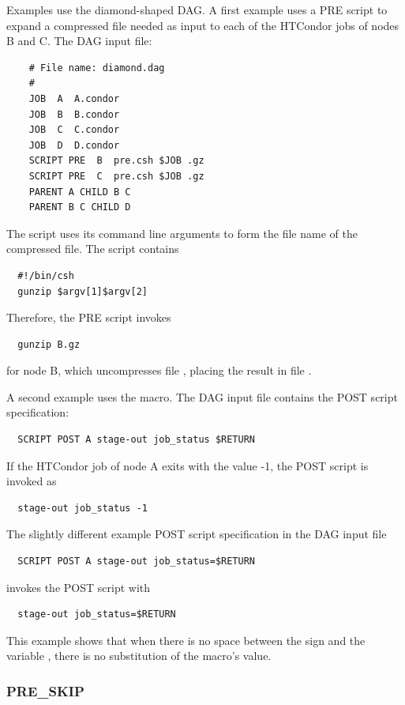 
Examples use the diamond-shaped DAG.
A first example uses a PRE script to expand a compressed file 
needed as input to each of the HTCondor jobs of nodes B and C.
The DAG input file:

\footnotesize
\begin{verbatim}
    # File name: diamond.dag
    #
    JOB  A  A.condor 
    JOB  B  B.condor 
    JOB  C  C.condor	
    JOB  D  D.condor
    SCRIPT PRE  B  pre.csh $JOB .gz
    SCRIPT PRE  C  pre.csh $JOB .gz
    PARENT A CHILD B C
    PARENT B C CHILD D
\end{verbatim}
\normalsize

The script  uses its command line arguments to form the file name
of the compressed file.
The script contains

\begin{verbatim}
  #!/bin/csh
  gunzip $argv[1]$argv[2]
\end{verbatim}

Therefore, the PRE script invokes  
\begin{verbatim}
  gunzip B.gz
\end{verbatim}
for node B, which uncompresses file ,
placing the result in file .

A second example uses the  macro.
The DAG input file contains the POST script specification:
\begin{verbatim}
  SCRIPT POST A stage-out job_status $RETURN 
\end{verbatim}
If the HTCondor job of node A exits with the value -1,
the POST script is invoked as
\begin{verbatim}
  stage-out job_status -1
\end{verbatim}

The slightly different example POST script specification
in the DAG input file
\begin{verbatim}
  SCRIPT POST A stage-out job_status=$RETURN 
\end{verbatim}
invokes the POST script with
\begin{verbatim}
  stage-out job_status=$RETURN
\end{verbatim}

This example shows that when
there is no space between the \Expr{=} sign and the variable ,
there is no substitution of the macro's value.

\subsubsection{\label{sec:dagman_pre_skip_command}PRE\_SKIP}
\label{dagman:PRE-SKIP}

